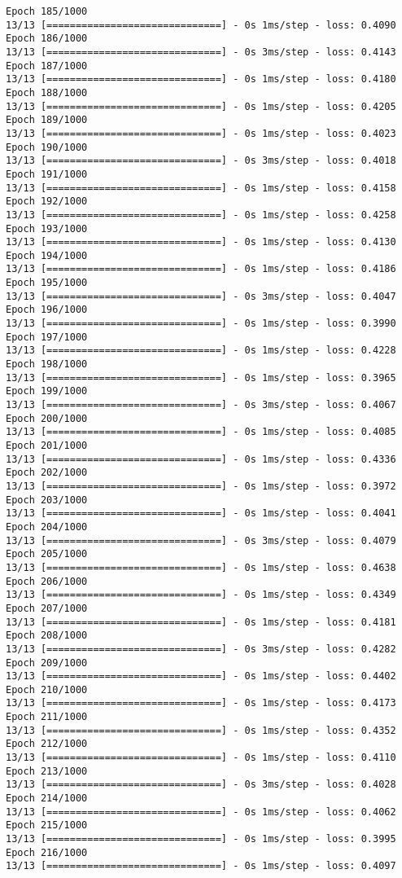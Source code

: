 \documentclass[11pt]{article}
\begin{document}
\begin{Verbatim}[commandchars=\\\{\}]
Epoch 185/1000
13/13 [==============================] - 0s 1ms/step - loss: 0.4090
Epoch 186/1000
13/13 [==============================] - 0s 3ms/step - loss: 0.4143
Epoch 187/1000
13/13 [==============================] - 0s 1ms/step - loss: 0.4180
Epoch 188/1000
13/13 [==============================] - 0s 1ms/step - loss: 0.4205
Epoch 189/1000
13/13 [==============================] - 0s 1ms/step - loss: 0.4023
Epoch 190/1000
13/13 [==============================] - 0s 3ms/step - loss: 0.4018
Epoch 191/1000
13/13 [==============================] - 0s 1ms/step - loss: 0.4158
Epoch 192/1000
13/13 [==============================] - 0s 1ms/step - loss: 0.4258
Epoch 193/1000
13/13 [==============================] - 0s 1ms/step - loss: 0.4130
Epoch 194/1000
13/13 [==============================] - 0s 1ms/step - loss: 0.4186
Epoch 195/1000
13/13 [==============================] - 0s 3ms/step - loss: 0.4047
Epoch 196/1000
13/13 [==============================] - 0s 1ms/step - loss: 0.3990
Epoch 197/1000
13/13 [==============================] - 0s 1ms/step - loss: 0.4228
Epoch 198/1000
13/13 [==============================] - 0s 1ms/step - loss: 0.3965
Epoch 199/1000
13/13 [==============================] - 0s 3ms/step - loss: 0.4067
Epoch 200/1000
13/13 [==============================] - 0s 1ms/step - loss: 0.4085
Epoch 201/1000
13/13 [==============================] - 0s 1ms/step - loss: 0.4336
Epoch 202/1000
13/13 [==============================] - 0s 1ms/step - loss: 0.3972
Epoch 203/1000
13/13 [==============================] - 0s 1ms/step - loss: 0.4041
Epoch 204/1000
13/13 [==============================] - 0s 3ms/step - loss: 0.4079
Epoch 205/1000
13/13 [==============================] - 0s 1ms/step - loss: 0.4638
Epoch 206/1000
13/13 [==============================] - 0s 1ms/step - loss: 0.4349
Epoch 207/1000
13/13 [==============================] - 0s 1ms/step - loss: 0.4181
Epoch 208/1000
13/13 [==============================] - 0s 3ms/step - loss: 0.4282
Epoch 209/1000
13/13 [==============================] - 0s 1ms/step - loss: 0.4402
Epoch 210/1000
13/13 [==============================] - 0s 1ms/step - loss: 0.4173
Epoch 211/1000
13/13 [==============================] - 0s 1ms/step - loss: 0.4352
Epoch 212/1000
13/13 [==============================] - 0s 1ms/step - loss: 0.4110
Epoch 213/1000
13/13 [==============================] - 0s 3ms/step - loss: 0.4028
Epoch 214/1000
13/13 [==============================] - 0s 1ms/step - loss: 0.4062
Epoch 215/1000
13/13 [==============================] - 0s 1ms/step - loss: 0.3995
Epoch 216/1000
13/13 [==============================] - 0s 1ms/step - loss: 0.4097

\end{Verbatim}
\end{document}
